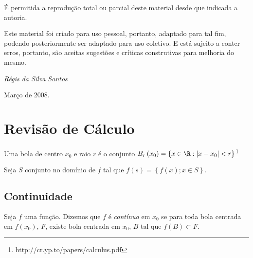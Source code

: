 \documentclass{book}
\begin{document}
\'E permitida a reprodu\c c\~ao total ou parcial deste material desde que indicada a autoria.

Este material foi criado para uso pessoal, portanto, adaptado para tal fim, podendo posteriormente ser adaptado para uso coletivo. E est\'a sujeito a conter erros, portanto, s\~ao aceitas sugest\~oes e cr\'iticas construtivas para melhoria do mesmo.

\vfill

\begin{flushright}
\textit{R\'egis da Silva Santos}

Mar\c co de 2008.
\end{flushright}
\tableofcontents
\listoffigures
\mainmatter
\pagestyle{fancy}

\chapter{Revis\~ao de C\'alculo} \label{chap01}

\begin{defn}
Uma bola de centro $x_0$ e raio $r$ \'e o conjunto $B_r \left( {x_0 } \right) = \left\{ {x \in \R:\left| {x - x_0 } \right| < r} \right\}$\footnote{http://cr.yp.to/papers/calculus.pdf}
\end{defn}


Seja $S$ conjunto no dom\'inio de $f$ tal que $f\left( s \right) = \left\{ {f\left( x \right);x \in S} \right\}$.


\section{Continuidade} \label{sec01}
\begin{defn}
Seja $f$ uma fun\c c\~ao. Dizemos que $f$ \'e \textit{cont\'inua} em $x_0$ se para toda bola centrada em $f\left( {x_0 } \right)$, $F$, existe bola centrada em $x_0$, $B$ tal que $f\left( B \right) \subset F$.
\end{defn}

\begin{figure}[!h]
  \centering
  \quad
\end{figure}
\end{document}
